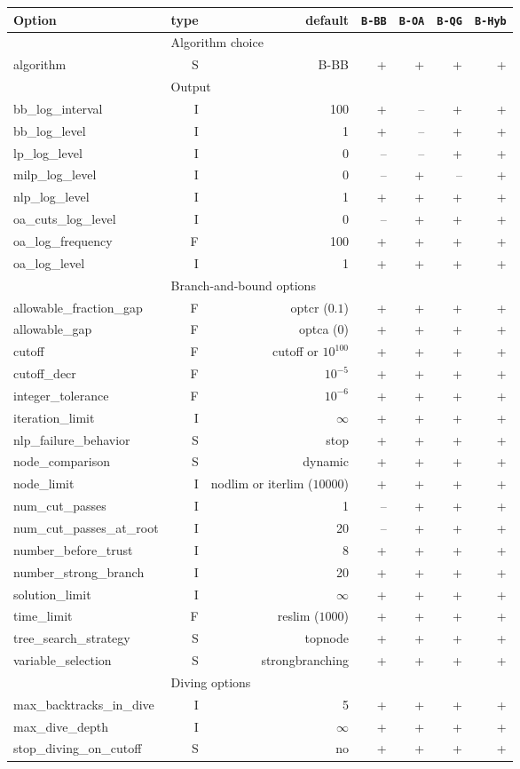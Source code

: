 \begin{center}
\begin{tabular}{|l|r|r|r|r|r|r|}\hline
Option & type &  default & {\tt B-BB} & {\tt B-OA} & {\tt B-QG} & {\tt B-Hyb} \\
\hline
\hline
\multicolumn{1}{|c}{} & \multicolumn{6}{l|}{Algorithm choice}\\
\hline
algorithm& S& B-BB& +& +& +& +\\
\hline
\multicolumn{1}{|c}{} & \multicolumn{6}{l|}{Output}\\
\hline
bb\_log\_interval& I& 100& +&--& +& +\\
bb\_log\_level& I& 1& +&--& +& +\\
lp\_log\_level& I& 0&--&--& +& +\\
milp\_log\_level& I& 0&--& +&--& +\\
nlp\_log\_level& I& 1& +& +& +& +\\
oa\_cuts\_log\_level& I& 0&--& +& +& +\\
oa\_log\_frequency& F& 100& +& +& +& +\\
oa\_log\_level& I& 1& +& +& +& +\\
\hline
\multicolumn{1}{|c}{} & \multicolumn{6}{l|}{Branch-and-bound options}\\
\hline
allowable\_fraction\_gap& F& optcr ($0.1$)& +& +& +& +\\
allowable\_gap& F& optca ($0$)& +& +& +& +\\
cutoff& F& cutoff or $10^{100}$& +& +& +& +\\
cutoff\_decr& F& $10^{-5}$& +& +& +& +\\
integer\_tolerance& F& $10^{-6}$& +& +& +& +\\
iteration\_limit& I& $\infty$& +& +& +& +\\
nlp\_failure\_behavior& S& stop& +& +& +& +\\
node\_comparison& S& dynamic& +& +& +& +\\
node\_limit& I& nodlim or iterlim ($10000$)& +& +& +& +\\
num\_cut\_passes& I& 1&--& +& +& +\\
num\_cut\_passes\_at\_root& I& 20&--& +& +& +\\
number\_before\_trust& I& 8& +& +& +& +\\
number\_strong\_branch& I& 20& +& +& +& +\\
solution\_limit& I& $\infty$& +& +& +& +\\
time\_limit& F& reslim ($1000$)& +& +& +& +\\
tree\_search\_strategy& S& topnode& +& +& +& +\\
variable\_selection& S& strongbranching& +& +& +& +\\
\hline
\multicolumn{1}{|c}{} & \multicolumn{6}{l|}{Diving options}\\
\hline
max\_backtracks\_in\_dive& I& 5& +& +& +& +\\
max\_dive\_depth& I& $\infty$& +& +& +& +\\
stop\_diving\_on\_cutoff& S& no& +& +& +& +\\
\hline
\end{tabular}


\end{center}

